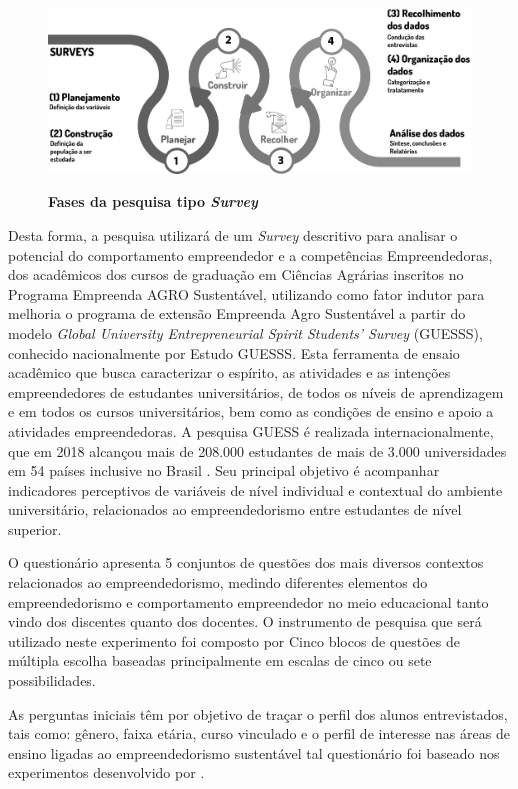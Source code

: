 \begin{figure}[!htb]
\centering
\caption{\textbf{Fases da pesquisa tipo \textit{Survey}}}
\includegraphics[scale=0.4]{Imagens/survey.png}
\label{figura_8}
\end{figure}

Desta forma, a pesquisa utilizará de um \textit{Survey} descritivo para analisar o potencial do comportamento empreendedor e a competências Empreendedoras, dos acadêmicos dos cursos de graduação em Ciências Agrárias inscritos no Programa Empreenda AGRO Sustentável, utilizando como fator indutor para melhoria o programa de extensão Empreenda Agro Sustentável a partir do modelo \textit{Global University Entrepreneurial Spirit Students’ Survey} (GUESSS), conhecido nacionalmente por Estudo GUESSS. Esta ferramenta de ensaio acadêmico que busca caracterizar o espírito, as atividades e as intenções empreendedores de estudantes universitários, de todos os níveis de aprendizagem e em todos os cursos universitários, bem como as condições de ensino e apoio a atividades empreendedoras. A pesquisa GUESS é realizada internacionalmente,  que em 2018 alcançou mais de 208.000 estudantes de mais de 3.000 universidades em 54 países inclusive no Brasil \cite{sieger_global_2018}.  Seu  principal  objetivo  é  acompanhar  indicadores perceptivos   de   variáveis   de   nível individual   e   contextual   do   ambiente   universitário, relacionados ao empreendedorismo entre estudantes de nível superior.

O questionário apresenta 5 conjuntos de questões dos mais diversos contextos relacionados ao empreendedorismo, medindo diferentes elementos do empreendedorismo e comportamento empreendedor no meio educacional tanto vindo dos discentes quanto dos docentes. O instrumento de pesquisa que será utilizado neste experimento foi composto por Cinco blocos de questões de múltipla escolha baseadas principalmente em escalas de cinco ou sete possibilidades. 

As perguntas iniciais têm por objetivo de traçar o perfil dos alunos entrevistados, tais como: gênero, faixa etária, curso vinculado e o perfil de interesse nas áreas de ensino ligadas ao empreendedorismo sustentável tal questionário foi baseado nos experimentos desenvolvido por . 


